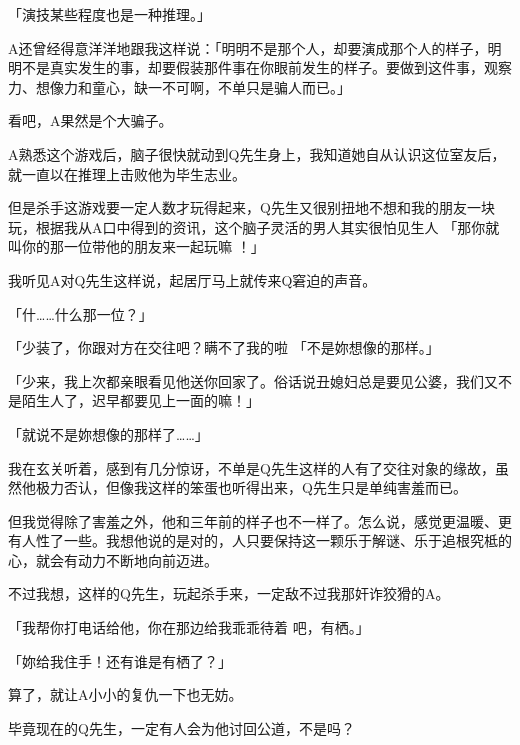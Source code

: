 \documentclass{article}
\begin{document}
「演技某些程度也是一种推理。」 

A还曾经得意洋洋地跟我这样说：「明明不是那个人，却要演成那个人的样子，明明不是真实发生的事，却要假装那件事在你眼前发生的样子。要做到这件事，观察力、想像力和童心，缺一不可啊，不单只是骗人而已。」 

看吧，A果然是个大骗子。 

A熟悉这个游戏后，脑子很快就动到Q先生身上，我知道她自从认识这位室友后，就一直以在推理上击败他为毕生志业。 

但是杀手这游戏要一定人数才玩得起来，Q先生又很别扭地不想和我的朋友一块玩，根据我从A口中得到的资讯，这个脑子灵活的男人其实很怕见生人
「那你就叫你的那一位带他的朋友来一起玩嘛
\newpage
！」 

我听见A对Q先生这样说，起居厅马上就传来Q窘迫的声音。 

「什……什么那一位？」 

「少装了，你跟对方在交往吧？瞒不了我的啦
「不是妳想像的那样。」 

「少来，我上次都亲眼看见他送你回家了。俗话说丑媳妇总是要见公婆，我们又不是陌生人了，迟早都要见上一面的嘛！」 

「就说不是妳想像的那样了……」 

我在玄关听着，感到有几分惊讶，不单是Q先生这样的人有了交往对象的缘故，虽然他极力否认，但像我这样的笨蛋也听得出来，Q先生只是单纯害羞而已。 

但我觉得除了害羞之外，他和三年前的样子也不一样了。怎么说，感觉更温暖、更有人性了一些。我想他说的是对的，人只要保持这一颗乐于解谜、乐于追根究柢的心，就会有动力不断地向前迈进。 

不过我想，这样的Q先生，玩起杀手来，一定敌不过我那奸诈狡猾的A。 

「我帮你打电话给他，你在那边给我乖乖待着
\newpage
吧，有栖。」 

「妳给我住手！还有谁是有栖了？」 

算了，就让A小小的复仇一下也无妨。 

毕竟现在的Q先生，一定有人会为他讨回公道，不是吗？
\end{document}
